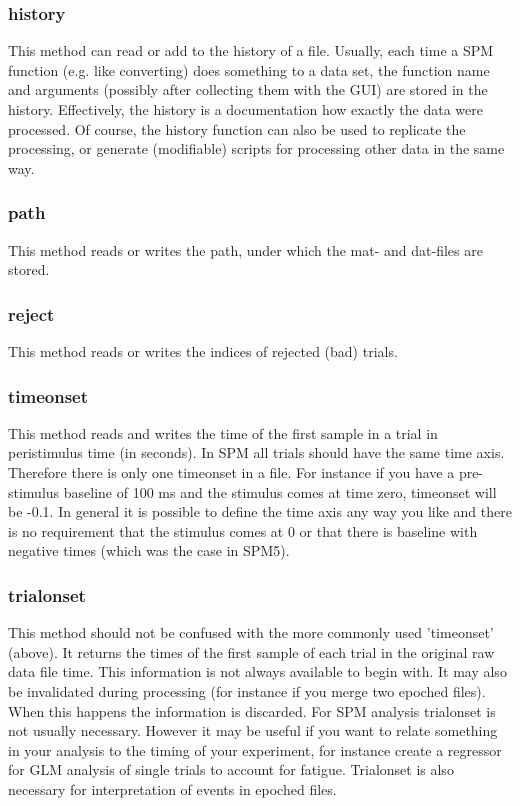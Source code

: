 \subsubsection{history}
This method can read or add to the history of a file. Usually, each
time a SPM function (e.g. like converting) does something to a data
set, the function name and arguments (possibly after collecting them
with the GUI) are stored in the history. Effectively, the history is a
documentation how exactly the data were processed. Of course, the
history function can also be used to replicate the processing, or
generate (modifiable) scripts for processing other data in the same
way.

\subsubsection{path}
This method reads or writes the path, under which the mat- and
dat-files are stored. 

\subsubsection{reject}
This method reads or writes the indices of rejected (bad) trials.

\subsubsection{timeonset}
This method reads and writes the time of the first sample in a trial
in peristimulus time (in seconds). In SPM all trials should have the
same time axis. Therefore there is only one timeonset in a file. For instance
if you have a pre-stimulus baseline of 100 ms and the stimulus comes at time zero,
timeonset will be -0.1. In general it is possible to define the time axis any way
you like and there is no requirement that the stimulus comes at 0 or that there
is baseline with negative times (which was the case in SPM5).

\subsubsection{trialonset}
This method should not be confused with the more commonly used 'timeonset' (above). 
It returns the times of the first sample of each trial in the original raw data
file time. This information is not always available to begin with. It may also be invalidated
during processing (for instance if you merge two epoched files). When this happens
the information is discarded. For SPM analysis trialonset is not usually necessary.
However it may be useful if you want to relate something in your analysis to the timing
of your experiment, for instance create a regressor for GLM analysis of single trials 
to account for fatigue. Trialonset is also necessary for interpretation of events in epoched
files.


